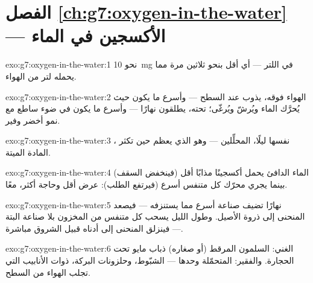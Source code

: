 \section*{الفصل \ref{ch:g7:oxygen-in-the-water} --- الأكسجين في الماء}

\begin{solution}{exo:g7:oxygen-in-the-water:1}
نحو \qty{10}{mg} في اللتر --- أي أقل بنحو ثلاثين مرة مما يحمله لتر
من الهواء.
\end{solution}

\begin{solution}{exo:g7:oxygen-in-the-water:2}
الهواء فوقه، يذوب عند السطح --- وأسرع ما يكون حيث يُحرَّك الماء
ويُرشّ ويُرغّى؛  تحته، يطلقون  نهارًا --- وأسرع ما
يكون في ضوء ساطع مع نمو أخضر وفير.
\end{solution}

\begin{solution}{exo:g7:oxygen-in-the-water:3}
 ،   نفسها ليلًا،  المحلِّلين ---
وهو الذي يعظم حين تكثر المادة الميتة.
\end{solution}

\begin{solution}{exo:g7:oxygen-in-the-water:4}
الماء الدافئ يحمل أكسجينًا مذابًا أقل (فينخفض السقف) بينما يجري
محرّك كل متنفس أسرع (فيرتفع الطلب): عرض أقل وحاجة أكثر، معًا.
\end{solution}

\begin{solution}{exo:g7:oxygen-in-the-water:5}
نهارًا تضيف صناعة   أسرع مما يستنزفه  ---
فيصعد المنحنى إلى ذروة الأصيل. وطول الليل يسحب كل متنفس من المخزون
بلا صناعة البتة --- فينزلق المنحنى إلى أدناه قبيل الشروق مباشرة.
\end{solution}

\begin{solution}{exo:g7:oxygen-in-the-water:6}
الغني: السلمون المرقط (أو صغاره)  ذباب مايو تحت الحجارة.
والفقير:  المتحمّلة وحدها --- الشبّوط، وحلزونات البركة،
 ذوات الأنابيب التي تجلب الهواء من السطح.
\end{solution}

